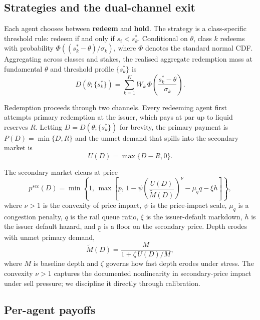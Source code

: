 \subsection{Strategies and the dual-channel exit}\label{sub:strategies}

Each agent chooses between \textbf{redeem} and \textbf{hold}. The strategy is a class-specific threshold rule: redeem if and only if $s_i < s^*_k$. Conditional on $\theta$, class $k$ redeems with probability $\Phi\!\left((s^*_k - \theta)/\sigma_k\right)$, where $\Phi$ denotes the standard normal CDF. Aggregating across classes and stakes, the realised aggregate redemption mass at fundamental $\theta$ and threshold profile $\{s^*_k\}$ is
\begin{equation}\label{eq:D}
D(\theta; \{s^*_k\}) = \sum_{k=1}^K W_k \, \Phi\!\left(\frac{s^*_k - \theta}{\sigma_k}\right).
\end{equation}

Redemption proceeds through two channels. Every redeeming agent first attempts primary redemption at the issuer, which pays at par up to liquid reserves $R$. Letting $D = D(\theta; \{s^*_k\})$ for brevity, the primary payment is $P(D) = \min\{D, R\}$ and the unmet demand that spills into the secondary market is
\begin{equation}\label{eq:U}
U(D) = \max\{D - R, 0\}.
\end{equation}

The secondary market clears at price
\begin{equation}\label{eq:psec}
p^{sec}(D) = \min\!\left\{1, \, \max\!\left[\underline{p}, \, 1 - \psi \!\left(\frac{U(D)}{\widetilde{M}(D)}\right)^\nu - \mu_q q - \xi h\right]\right\},
\end{equation}
where $\nu > 1$ is the convexity of price impact, $\psi$ is the price-impact scale, $\mu_q$ is a congestion penalty, $q$ is the rail queue ratio, $\xi$ is the issuer-default markdown, $h$ is the issuer default hazard, and $\underline{p}$ is a floor on the secondary price. Depth erodes with unmet primary demand,
\begin{equation}\label{eq:Mtilde}
\widetilde{M}(D) = \frac{M}{1 + \zeta \, U(D)/M},
\end{equation}
where $M$ is baseline depth and $\zeta$ governs how fast depth erodes under stress. The convexity $\nu > 1$ captures the documented nonlinearity in secondary-price impact under sell pressure; we discipline it directly through calibration.

\subsection{Per-agent payoffs}\label{sub:payoffs}

